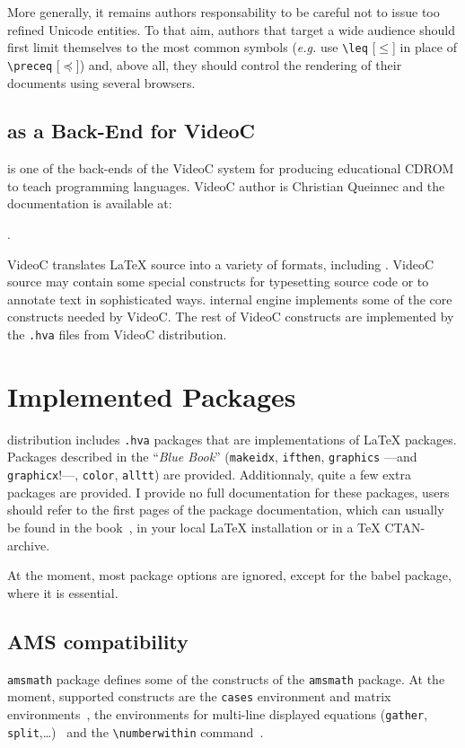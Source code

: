 More generally, it remains authors responsability to be careful not to
issue too refined Unicode entities.  To that aim, authors that target
a wide audience should first limit themselves to the most common
symbols (\emph{e.g.} use \verb+\leq+ [$\leq$]
in place of \verb+\preceq+ [$\preceq$]) and, above all,
they should control the rendering of their documents using several browsers.


\subsection{\hevea{} as a Back-End for VideoC}
\hevea{} is one of the back-ends of the VideoC system for producing
educational CDROM to teach programming languages.
VideoC author is Christian Queinnec and the documentation is available
at:
\begin{center}
.
\end{center}


VideoC translates \LaTeX{} source into a variety of formats, including
\html. VideoC source may contain some special constructs for
typesetting source code or to annotate text in sophisticated ways.
\hevea{} internal engine implements some of the core constructs needed
by VideoC. The rest of VideoC constructs are implemented by
the \texttt{.hva} files from VideoC distribution.


\section{Implemented Packages}\label{implemented:package}
%
\hevea{} distribution includes \texttt{.hva} packages that are
implementations of \LaTeX{} packages.
Packages described in the ``\emph{Blue Book}'' (\texttt{makeidx},
\texttt{ifthen}, \texttt{graphics} ---and \texttt{graphicx}!---,
\texttt{color}, \texttt{alltt}) are provided.  Additionnaly, quite a
few extra packages are provided.  I provide no full documentation for
these packages, users should refer to the first pages of the package
documentation, which can usually be found in the book~\cite{latexbis},
in your local
\LaTeX{} installation or in a TeX CTAN-archive.

At the moment, most package options are ignored, except for the babel
package, where it is essential.

\subsection{AMS compatibility}
%
\hevea{} \texttt{amsmath} package defines  some of the constructs of the
\texttt{amsmath} package.  At the moment, supported constructs are
the \verb+cases+ environment and matrix
environments~\cite[Section~8.4]{latexbis}, the
environments for multi-line displayed
equations (\verb+gather+,
\verb+split+,\ldots)~\cite[Section~8.5]{latexbis} and the
\verb+\numberwithin+ command~\cite[Section~8.6.2]{latexbis}.

